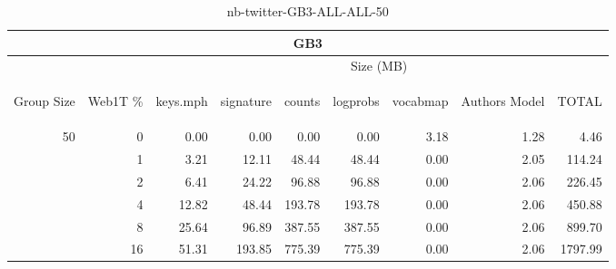 \begin{center}
\begin{table}[htbp]
\begin{tabular}{ | r | r | r | r | r | r | r | r | r |}
\hline
\multicolumn{9}{|c|}{GB3}\\
\hline
 & & \multicolumn{7}{|c|}{Size (MB)}\\ \cline{3-9}
\begin{sideways}Group Size\end{sideways} & \begin{sideways}Web1T \% \end{sideways} & \begin{sideways}keys.mph\end{sideways} & \begin{sideways}signature\end{sideways} & \begin{sideways}counts\end{sideways} & \begin{sideways}logprobs\end{sideways} & \begin{sideways}vocabmap\end{sideways} & \begin{sideways}Authors Model \end{sideways} & \begin{sideways}TOTAL\end{sideways}\\
\hline
\multirow{5}{*}{50}
 & 0 & 0.00 & 0.00 & 0.00 & 0.00 & 3.18 & 1.28 & 4.46\\ \cline{2-9}
 & 1 & 3.21 & 12.11 & 48.44 & 48.44 & 0.00 & 2.05 & 114.24\\ \cline{2-9}
 & 2 & 6.41 & 24.22 & 96.88 & 96.88 & 0.00 & 2.06 & 226.45\\ \cline{2-9}
 & 4 & 12.82 & 48.44 & 193.78 & 193.78 & 0.00 & 2.06 & 450.88\\ \cline{2-9}
 & 8 & 25.64 & 96.89 & 387.55 & 387.55 & 0.00 & 2.06 & 899.70\\ \cline{2-9}
 & 16 & 51.31 & 193.85 & 775.39 & 775.39 & 0.00 & 2.06 & 1797.99\\ \cline{2-9}
\hline
\end{tabular}
\caption{nb-twitter-GB3-ALL-ALL-50}
\label{table:nb-twitter-GB3-ALL-ALL-50}
\end{table}
\end{center}

